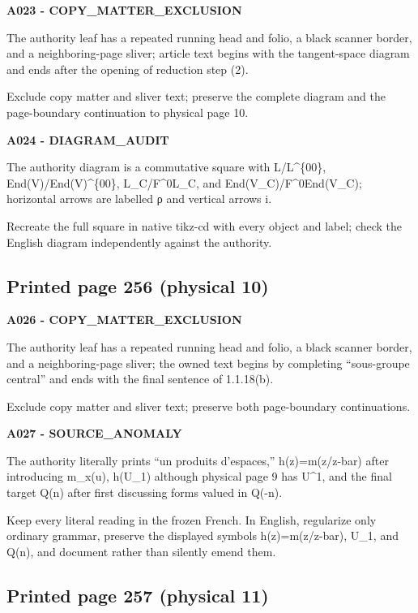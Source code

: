 \documentclass[10pt,a4paper]{article}
\begin{document}
\textbf{A023 - COPY\_MATTER\_EXCLUSION}

The authority leaf has a repeated running head and folio, a black scanner border, and a neighboring-page sliver; article text begins with the tangent-space diagram and ends after the opening of reduction step (2).

Exclude copy matter and sliver text; preserve the complete diagram and the page-boundary continuation to physical page 10.

\textbf{A024 - DIAGRAM\_AUDIT}

The authority diagram is a commutative square with L/L\^{}\{00\}, End(V)/End(V)\^{}\{00\}, L\_C/F\^{}0L\_C, and End(V\_C)/F\^{}0End(V\_C); horizontal arrows are labelled ρ and vertical arrows i.

Recreate the full square in native tikz-cd with every object and label; check the English diagram independently against the authority.

\subsection{Printed page 256 (physical 10)}

\textbf{A026 - COPY\_MATTER\_EXCLUSION}

The authority leaf has a repeated running head and folio, a black scanner border, and a neighboring-page sliver; the owned text begins by completing ``sous-groupe central'' and ends with the final sentence of 1.1.18(b).

Exclude copy matter and sliver text; preserve both page-boundary continuations.

\textbf{A027 - SOURCE\_ANOMALY}

The authority literally prints ``un produits d'espaces,'' h(z)=m(z/z-bar) after introducing m\_x(u), h(U\_1) although physical page 9 has U\^{}1, and the final target Q(n) after first discussing forms valued in Q(-n).

Keep every literal reading in the frozen French. In English, regularize only ordinary grammar, preserve the displayed symbols h(z)=m(z/z-bar), U\_1, and Q(n), and document rather than silently emend them.

\subsection{Printed page 257 (physical 11)}
\end{document}
